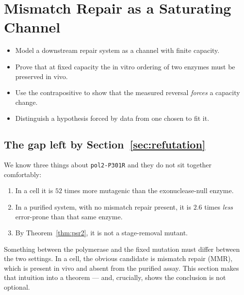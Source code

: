 \section{Mismatch Repair as a Saturating Channel}\label{sec:mmr}

\begin{objectives}
\begin{itemize}[leftmargin=*,itemsep=1pt,topsep=1pt]
  \item Model a downstream repair system as a channel with finite capacity.
  \item Prove that at fixed capacity the in vitro ordering of two enzymes must be preserved in vivo.
  \item Use the contrapositive to show that the measured reversal \emph{forces} a capacity change.
  \item Distinguish a hypothesis forced by data from one chosen to fit it.
\end{itemize}
\end{objectives}

\subsection{The gap left by Section~\ref{sec:refutation}}

We know three things about \texttt{pol2-P301R} and they do not sit together
comfortably:

\begin{enumerate}[leftmargin=*,itemsep=1pt]
  \item In a cell it is $52$ times more mutagenic than the exonuclease-null enzyme.
  \item In a purified system, with no mismatch repair present, it is $2.6$ times
        \emph{less} error-prone than that same enzyme.
  \item By Theorem~\ref{thm:psr2}, it is not a stage-removal mutant.
\end{enumerate}

Something between the polymerase and the fixed mutation must differ between the
two settings. In a cell, the obvious candidate is mismatch repair (MMR), which is
present in vivo and absent from the purified assay. This section makes that
intuition into a theorem --- and, crucially, shows the conclusion is not optional.

